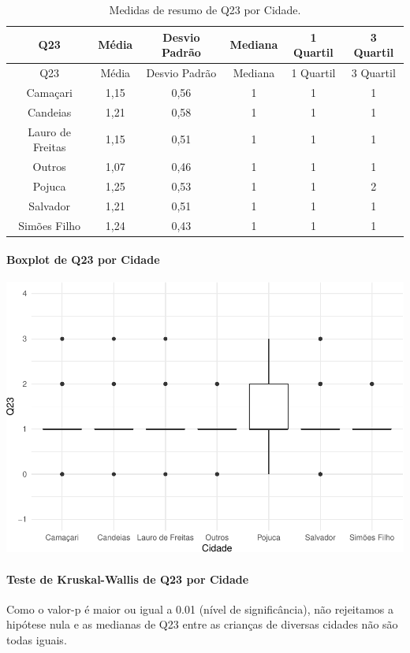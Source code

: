 \documentclass[]{article}
\let\oldparagraph\paragraph
\renewcommand{\paragraph}[1]{\oldparagraph{#1}\mbox{}}
\begin{document}
\begin{longtable}[]{@{}cccccc@{}}
\caption{\label{tab:unnamed-chunk-547}Medidas de resumo de Q23 por Cidade.}\tabularnewline
\toprule
Q23 & Média & Desvio Padrão & Mediana & 1 Quartil & 3 Quartil\tabularnewline
\midrule
\endfirsthead
\toprule
Q23 & Média & Desvio Padrão & Mediana & 1 Quartil & 3 Quartil\tabularnewline
\midrule
\endhead
Camaçari & 1,15 & 0,56 & 1 & 1 & 1\tabularnewline
Candeias & 1,21 & 0,58 & 1 & 1 & 1\tabularnewline
Lauro de Freitas & 1,15 & 0,51 & 1 & 1 & 1\tabularnewline
Outros & 1,07 & 0,46 & 1 & 1 & 1\tabularnewline
Pojuca & 1,25 & 0,53 & 1 & 1 & 2\tabularnewline
Salvador & 1,21 & 0,51 & 1 & 1 & 1\tabularnewline
Simões Filho & 1,24 & 0,43 & 1 & 1 & 1\tabularnewline
\bottomrule
\end{longtable}

\hypertarget{boxplot-de-q23-por-cidade}{%
\paragraph{Boxplot de Q23 por Cidade}\label{boxplot-de-q23-por-cidade}}

\begin{center}\includegraphics[width=0.75\linewidth]{relatorio_covid19_files/figure-latex/unnamed-chunk-548-1} \end{center}

\hypertarget{teste-de-kruskal-wallis-de-q23-por-cidade}{%
\paragraph{Teste de Kruskal-Wallis de Q23 por Cidade}\label{teste-de-kruskal-wallis-de-q23-por-cidade}}

Como o valor-p é maior ou igual a 0.01 (nível de significância), não rejeitamos a hipótese nula e as medianas de Q23 entre as crianças de diversas cidades não são todas iguais.
\end{document}
